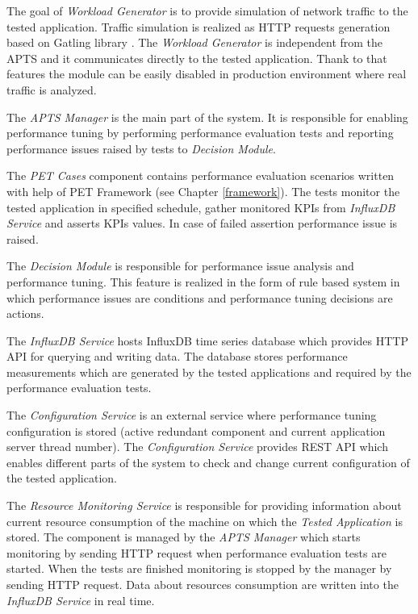 \documentclass[10pt,a4paper]{article}
\begin{document}
The goal of \textit{Workload Generator} is to provide simulation of network traffic to the tested application. Traffic simulation is realized as HTTP requests generation based on Gatling library \cite{gatling}. The \textit{Workload Generator} is independent from the APTS and it communicates directly to the tested application. Thank to that features the module can be easily disabled in production environment where real traffic is analyzed.  

The \textit{APTS Manager} is the main part of the system. It is responsible for enabling performance tuning by performing performance evaluation tests and reporting performance issues raised by tests to \textit{Decision Module}. 

The \textit{PET Cases} component contains performance evaluation scenarios written with help of PET Framework (see Chapter \ref{framework}). The tests monitor the tested application in specified schedule, gather monitored KPIs from \textit{InfluxDB Service} and asserts KPIs values. In case of failed assertion performance issue is raised.

The \textit{Decision Module} is responsible for performance issue analysis and performance tuning. This feature is realized in the form of rule based system in which performance issues are conditions and performance tuning decisions are actions.   

The \textit{InfluxDB Service} hosts InfluxDB \cite{influxdb} time series database which provides HTTP API for querying and writing data. The database stores performance measurements which are generated by the tested applications and required by the performance evaluation tests.

The \textit{Configuration Service} is an external service where performance tuning configuration is stored (active redundant component and current application server thread number). The \textit{Configuration Service} provides REST API which enables different parts of the system to check and change current configuration of the tested application.

The \textit{Resource Monitoring Service} is responsible for providing information about current resource consumption of the machine on which the \textit{Tested Application} is stored. The component is managed by the \textit{APTS Manager} which starts monitoring by sending HTTP request when performance evaluation tests are started. When the tests are finished monitoring is stopped by the manager by sending HTTP request. Data about resources consumption are written into the \textit{InfluxDB Service} in real time. 
\end{document}
